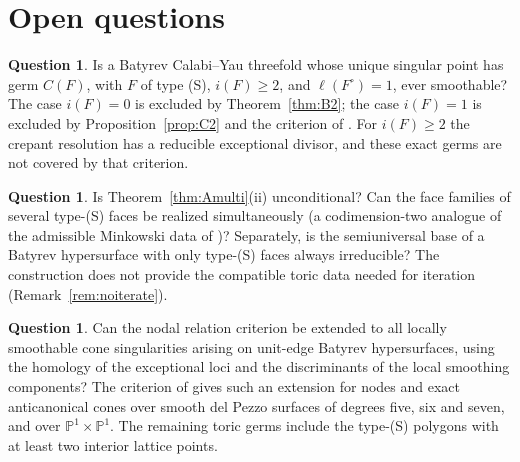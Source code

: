\documentclass[11pt]{amsart}
\theoremstyle{definition}
\newtheorem{question}[theorem]{Question}
\theoremstyle{remark}
\newcommand{\PP}{\mathbb{P}}
\begin{document}
\section{Open questions}\label{sec:open}

\begin{question}\label{q:ell1}
Is a Batyrev Calabi--Yau threefold whose unique singular point has
germ $C(F)$, with $F$ of type \textup{(S)}, $i(F)\ge2$, and
$\ell(F^\circ)=1$, ever smoothable?
The case $i(F)=0$ is excluded by Theorem~\ref{thm:B2}; the case
$i(F)=1$ is excluded by Proposition~\ref{prop:C2} and the criterion
of \cite{paper5}.  For $i(F)\ge2$ the crepant resolution has a
reducible exceptional divisor, and these exact germs are not covered
by that criterion.
\end{question}

\begin{question}\label{q:multi}
Is Theorem~\ref{thm:Amulti}(ii) unconditional?  Can the
face families of several type-\textup{(S)} faces be realized
simultaneously (a codimension-two analogue of the admissible Minkowski
data of \cite{CHP24})?  Separately, is the semiuniversal base of a Batyrev
hypersurface with only type-\textup{(S)} faces always irreducible?  The
construction does not provide the compatible toric data needed for
iteration (Remark~\ref{rem:noiterate}).
\end{question}

\begin{question}
Can the nodal relation criterion be extended to all locally smoothable
cone singularities arising on unit-edge Batyrev hypersurfaces, using the
homology of the exceptional loci and the discriminants of the local
smoothing components?  The criterion of \cite{paper5} gives such an
extension for nodes and exact anticanonical cones over smooth del Pezzo
surfaces of degrees five, six and seven, and over $\PP^1\times\PP^1$.
The remaining toric germs include the type-\textup{(S)} polygons with
at least two interior lattice points.
\end{question}
\end{document}
